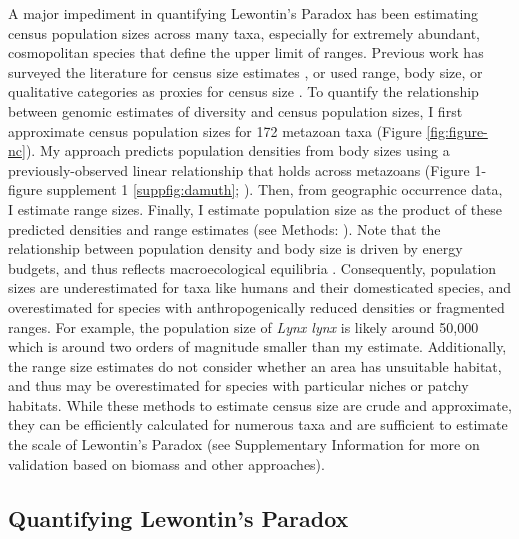 \documentclass[11pt]{article}
\newcommand{\Newnameref}[1]{\textit{\nameref{#1}}}
\begin{document}
A major impediment in quantifying Lewontin's Paradox has been estimating census
population sizes across many taxa, especially for extremely abundant,
cosmopolitan species that define the upper limit of ranges. Previous work has
surveyed the literature for census size estimates
\parencite{Nei1984-zi,Soule1976-he,Frankham1996-yb}, or used range, body size,
or qualitative categories as proxies for census size
\parencite{Corbett-Detig2015-gt,Leffler2012-zj}. To quantify the relationship
between genomic estimates of diversity and census population sizes, I first
approximate census population sizes for 172 metazoan taxa (Figure
\ref{fig:figure-nc}). My approach predicts population densities from body sizes
using a previously-observed linear relationship that holds across metazoans
(Figure 1-figure supplement 1 \ref{suppfig:damuth};
\cite{Damuth1981-st,Damuth1987-sg}). Then, from geographic occurrence data, I
estimate range sizes.  Finally, I estimate population size as the product of
these predicted densities and range estimates (see Methods:
\Newnameref{sec:methods-popsize}). Note that the relationship between
population density and body size is driven by energy budgets, and thus reflects
macroecological equilibria \parencite{Damuth1987-sg}. Consequently, population
sizes are underestimated for taxa like humans and their domesticated species,
and overestimated for species with anthropogenically reduced densities or
fragmented ranges. For example, the population size of \emph{Lynx lynx} is
likely around 50,000 \parencite{Iucn2020-ap} which is around two orders of
magnitude smaller than my estimate. Additionally, the range size estimates do
not consider whether an area has unsuitable habitat, and thus may be
overestimated for species with particular niches or patchy habitats. While
these methods to estimate census size are crude and approximate, they can be
efficiently calculated for numerous taxa and are sufficient to estimate the
scale of Lewontin's Paradox (see Supplementary Information
\Newnameref{supp:popsize-valid} for more on validation based on biomass and
other approaches). 

\subsection*{Quantifying Lewontin's Paradox}
\end{document}
